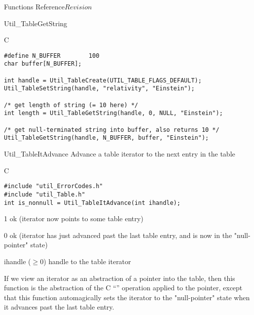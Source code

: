 \begin{cactuspart}{ Functions Reference}{}{$Revision$}
\begin{FunctionDescription}{Util\_TableGetString}
\begin{ExampleSection}
\begin{Example}{C}
\begin{verbatim}
#define N_BUFFER        100
char buffer[N_BUFFER];

int handle = Util_TableCreate(UTIL_TABLE_FLAGS_DEFAULT);
Util_TableSetString(handle, "relativity", "Einstein");

/* get length of string (= 10 here) */
int length = Util_TableGetString(handle, 0, NULL, "Einstein");

/* get null-terminated string into buffer, also returns 10 */
Util_TableGetString(handle, N_BUFFER, buffer, "Einstein");
\end{verbatim}
\end{Example}
\end{ExampleSection}
\end{FunctionDescription}


\begin{FunctionDescription}{Util\_TableItAdvance}
\label{Util-TableItAdvance}
Advance a table iterator to the next entry in the table

\begin{SynopsisSection}
\begin{Synopsis}{C}
\begin{verbatim}
#include "util_ErrorCodes.h"
#include "util_Table.h"
int is_nonnull = Util_TableItAdvance(int ihandle);
\end{verbatim}
\end{Synopsis}
\end{SynopsisSection}

\begin{ResultSection}
\begin{Result}{\rm 1}
ok (iterator now points to some table entry)
\end{Result}
\begin{Result}{\rm 0}
ok (iterator has just advanced past the last table entry,
    and is now in the "null-pointer" state)
\end{Result}
\end{ResultSection}

\begin{ParameterSection}
\begin{Parameter}{ihandle ($\ge 0$)}
handle to the table iterator
\end{Parameter}
\end{ParameterSection}

\begin{Discussion}
If we view an iterator as an abstraction of a pointer into the table,
then this function is the abstraction of the C ``\code{++}'' operation
applied to the pointer, except that this function automagically sets
the iterator to the "null-pointer" state when it advances past the
last table entry.


\end{Discussion}
\end{FunctionDescription}
\end{cactuspart}
